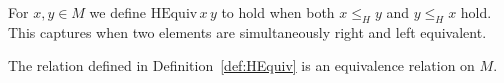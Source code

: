 \begin{definition}[H equivalence]
\label{def:HEquiv}
For \(x,y\in M\) we define \(\mathrm{HEquiv}\,x\,y\) to hold when both \(x \le_H y\) and \(y \le_H x\) hold.  This captures when two elements are simultaneously right and left equivalent.
\leanok
\end{definition}

\begin{lemma}
\label{lem:HEquiv-isEquivalence}
The relation defined in Definition~\ref{def:HEquiv} is an equivalence relation on \(M\).
\leanok
{}
\end{lemma}
